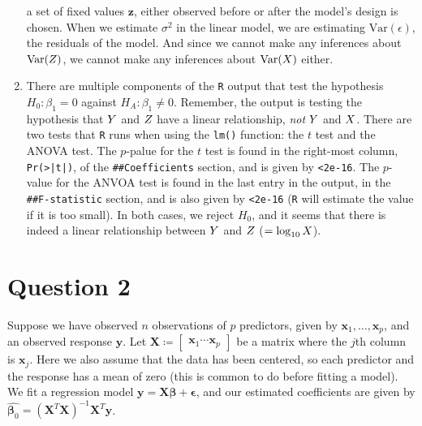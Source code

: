 \documentclass[10pt]{article}
\begin{document}
\begin{enumerate}
    a set of fixed values \(\mathbf{z}\), either observed before or after the model's design is chosen. When we estimate \(\sigma^2\) in 
    the linear model, we are estimating \(\mathrm{Var}(\epsilon)\), the residuals of the model. And since we cannot make any inferences about 
    \(\mathrm{Var}(Z)\), we cannot make any inferences about \(\mathrm{Var}(X)\) either. 
    \item There are multiple components of the \texttt{R} output that test the hypothesis \(H_0 : \beta_1 = 0\) against \(H_A : \beta_1 \neq 0\). 
    Remember, the output is testing the hypothesis that \(Y\) and \(Z\) have a linear relationship, \textsl{not} \(Y\) and \(X\). 
    There are two tests that \texttt{R} runs when using the \texttt{lm()} function: the \(t\) test and the ANOVA test. The \(p\)-palue for the \(t\) test
    is found in the right-most column, \texttt{Pr(>|t|)}, of the \texttt{\#{}\#{}Coefficients} section, and is given by \texttt{<2e-16}. 
    The \(p\)-value for the ANVOA test is found in the last entry in the output, in the \texttt{\#{}\#{}F-statistic} section, and is also given by \texttt{<2e-16}
    (\texttt{R} will estimate the value if it is too small). In both cases, we reject \(H_0\), and it seems that there is indeed a linear relationship 
    between \(Y\) and \(Z\) (\(=\log_{10}X\)). 
\end{enumerate}

\newcommand{\mx}{\mathbf{X}}
\newcommand{\ax}{\widetilde{\mathbf{X}}}
\section{Question 2} \noindent
Suppose we have observed \(n\) observations of \(p\) predictors, given by \(\mathbf{x}_1, \ldots, \mathbf{x}_p\), and an observed response \(\mathbf{y}\).
Let \(\mathbf{X} \coloneqq \begin{bmatrix}
    \mathbf{x}_1 \cdots \mathbf{x}_p
\end{bmatrix}\) be a matrix where the \(j\)th column is \(\mathbf{x}_j\).
Here we also assume that the data has been centered, so each predictor and the response has a mean of zero (this is common to do before fitting a model).
We fit a regression model \(\mathbf{y} = \mathbf{X}\bm{\beta} + \bm{\epsilon}\), and our estimated coefficients are given by 
\(\hat{\bm{\beta}_0} = (\mathbf{X}^T\mathbf{X})^{-1}\mathbf{X}^T\mathbf{y}\). 
\end{document}
